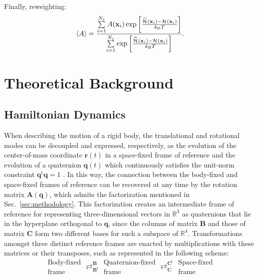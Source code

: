 \documentclass[
journal=jctcce,
layout=twocolumn
]{achemso}
\newcommand{\mt}[1]{\boldsymbol{\mathbf{#1}}}   %
\newcommand{\vt}[1]{\boldsymbol{\mathbf{#1}}}   %
\newcommand{\tr}[1]{#1^\text{t}}                %
\newcommand{\Ham}[1]{{\mathcal H}_\text{#1}}    %
\newcommand{\modified}[1]{\widetilde{#1}}
\begin{document}
Finally, reweighting:
\begin{equation}
\label{eq:reweighting}
\langle A \rangle = \frac{\sum\limits_{i=1}^{N_s} A(\vt x_i) \exp \left[{\frac{\modified{\Ham{}}(\vt x_i) - {\Ham{}}(\vt x_i)}{k_\text{\tiny B} T}}\right]}{\sum\limits_{i=1}^{N_s} \exp \left[{\frac{\modified{\Ham{}}(\vt x_i) - {\Ham{}}(\vt x_i)}{k_\text{\tiny B} T}}\right] }.
\end{equation}

\section{Theoretical Background}
\label{sec:theory}

\subsection{Hamiltonian Dynamics}
\label{eq:hamiltonian dynamics}

When describing the motion of a rigid body, the translational and rotational modes can be decoupled and expressed, respectively, as the evolution of the center-of-mass coordinate $\vt r(t)$ in a space-fixed frame of reference and the evolution of a quaternion $\vt q(t)$ which continuously satisfies the unit-norm constraint $\tr{\vt q}{\vt q} = 1$ \cite{Goldstein_2002}.
In this way, the connection between the body-fixed and space-fixed frames of reference can be recovered at any time by the rotation matrix $\mt A(\vt q)$, which admits the factorization mentioned in Sec.~\ref{sec:methodology}.
This factorization creates an intermediate frame of reference for representing three-dimensional vectors in $\mathbb{R}^3$ as quaternions that lie in the hyperplane orthogonal to $\vt q$, since the columns of matrix $\mt B$ and those of matrix $\mt C$ form two different bases for such a subspace of $\mathbb{R}^4$.
Transformations amongst three distinct reference frames are enacted by multiplications with these matrices or their transposes, such as represented in the following scheme:
\begin{equation*}
\boxed{\substack{\text{Body-fixed} \\ \text{frame}}}
\mathrel{\mathop{\rightleftarrows}^{\mt B}_{\tr{\mt B}}}
\boxed{\substack{\text{Quaternion-fixed} \\ \text{frame}}}
\mathrel{\mathop{\rightleftarrows}^{\tr{\mt C}}_{\mt C}}
\boxed{\substack{\text{Space-fixed} \\ \text{frame}}}
\end{equation*}
\end{document}

